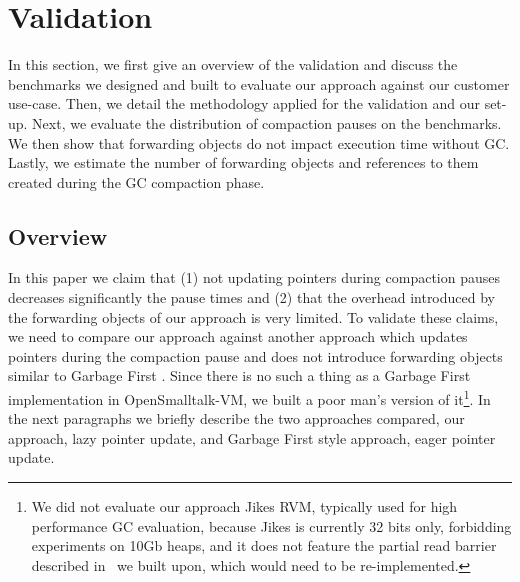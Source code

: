 \documentclass[sigplan,10pt,review,anonymous]{acmart}\settopmatter{printfolios=true,printccs=false,printacmref=false}
\newcommand{\egb}[1]{\color{blue}\fbox{\bfseries\sffamily\scriptsize Elisa:}{\sf\small$\blacktriangleright$\textit{#1}$\blacktriangleleft$}\color{black}}
\def\OpenSmalltalkVM{OpenSmalltalk-VM\xspace}
\begin{document}
\section{Validation}
\label{sec:validation}

In this section, we first give an overview of the validation and discuss the benchmarks we designed and built to evaluate our approach against our customer use-case. Then, we detail the methodology applied for the validation and our set-up. Next, we evaluate the distribution of compaction pauses on the benchmarks. We then show that forwarding objects do not impact execution time without GC. Lastly, we estimate the number of forwarding objects and references to them created during the GC compaction phase.

\subsection{Overview}
\label{sec:ow}

In this paper we claim that (1) not updating pointers during compaction pauses decreases significantly the pause times and (2) that the overhead introduced by the forwarding objects of our approach is very limited. To validate these claims, we need to compare our approach against another approach which updates pointers during the compaction pause and does not introduce forwarding objects similar to Garbage First \cite{G1}. 
Since there is no such a thing as a Garbage First implementation in \OpenSmalltalkVM, we built a poor man's version of it\footnote{%
We did not evaluate our approach Jikes RVM, typically used for high performance GC evaluation, because Jikes is currently 32 bits only, forbidding experiments on 10Gb heaps, %
and it does not feature the partial read barrier described in~\cite{Forwarders} we built upon, which would need to be re-implemented.}.
In the next paragraphs we briefly describe the two approaches compared, our approach, %
lazy pointer update, and %
Garbage First style approach, %
eager pointer update.
\end{document}
